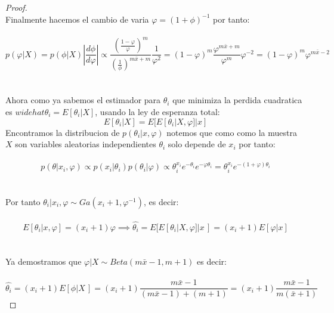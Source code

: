 \documentclass[11pt,letterpaper]{article}
\begin{document}
\begin{proof}
    \,\\
    Finalmente hacemos el cambio de varia $\varphi=(1+\phi)^{-1}$ por tanto:\,\\
    \,\\
    \begin{equation*}
       p(\varphi|X)=p(\phi|X)\left|\frac{d\phi}{d\varphi}\right|\propto \frac{\left(\frac{1-\varphi}{\varphi}\right)^m}{\left(\frac{1}{\phi}\right)^{m\bar{x}+m}}\frac{1}{\varphi^2}=(1-\varphi)^m\frac{\varphi^{m\bar{x}+m}}{\varphi^m} \varphi^{-2}=(1-\varphi)^{m}\varphi^{m\bar{x}-2}
    \end{equation*}\,\\
    \,\\
    Ahora como ya sabemos el estimador para $\theta_i$ que minimiza la perdida cuadratica es $widehat{\theta_i}=E[\theta_i|X]$, usando la ley de esperanza total:\,\\
    \begin{equation*}
        E[\theta_i|X]=E[E[\theta_i|X,\varphi]|x]
    \end{equation*}
    Encontramos la distribucion de $p(\theta_i|x,\varphi)$ notemos que como como la muestra $X$ son variables aleatorias independientes $\theta_i$ solo depende de $x_i$ por tanto:\,\\
    \,\\
    \begin{equation*}
        p(\theta|x_i,\varphi)\propto p(x_i|\theta_i)p(\theta_i|\varphi)\propto \theta_i^{x_i}e^{-\theta_i}e^{-\varphi\theta_i}=\theta_i^{x_i}e^{-(1+\varphi)\theta_i}
    \end{equation*}\,\\
    \,\\
    Por tanto $\theta_i|x_i,\varphi\sim Ga(x_i+1,\varphi^{-1})$, es decir:\,\\
    \,\\
    \begin{equation*}
        E[\theta_i|x,\varphi]=(x_i+1)\varphi\implies \widehat{\theta_i}=E[E[\theta_i|X,\varphi]|x\,]=(x_i+1)E[\varphi|x] 
    \end{equation*}\,\\
    \,\\
    Ya demostramos que $\varphi|X\sim Beta(m\bar{x}-1,m+1)$ es decir:\,\\
    \,\\
    \begin{equation*}
        \widehat{\theta_i}=(x_i+1)E[\phi|X\,]=(x_i+1)\frac{m\bar{x}-1}{(m\bar{x}-1)+(m+1)}=(x_i+1)\frac{m\bar{x}-1}{m(\bar{x}+1)} 
    \end{equation*}

\end{proof}
\end{document}

